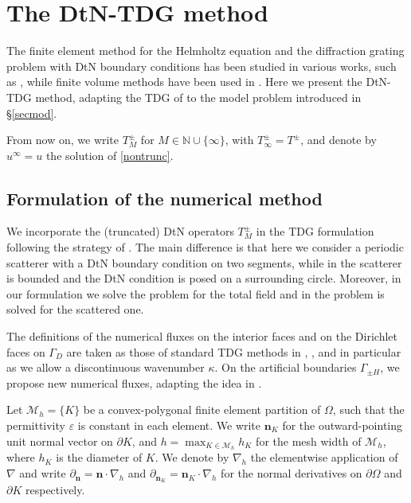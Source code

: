 \documentclass[a4paper,10pt]{article}
\newcommand{\IN}{{\mathbb N}}
\newcommand{\bn}{{\mathbf n}}
\newcommand{\Mh}{{\mathcal M_h}}
\newcommand{\dn}{{\partial_\bn}}
\newcommand{\dnK}{{\partial_{\bn_K}}}
\newcommand{\GD}{{\Gamma_D}}
\newcommand{\GpmH}{{\Gamma_{\pm H}}}
\begin{document}
\section{The DtN-TDG method}
\label{s:TDG}
The finite element method for the Helmholtz equation and the diffraction grating problem with DtN boundary conditions has been studied in various works, such as \cite{Bao2000,BaoLi2022,Bao1995}{, while finite volume methods have been used in} \cite{Wang2022}.
Here we present the DtN-TDG method, adapting the TDG of \cite{Hiptmair2011,Hiptmair2016,Kapita2018,Howarth2014} to the model problem introduced in \S\ref{secmod}.

From now on, we write $T_M^\pm$ for $M\in \IN\cup\{\infty\}$, with $T_\infty^\pm=T^\pm$, and denote by $u^\infty=u$ the solution of \eqref{nontrunc}.

\subsection{Formulation of the numerical method} \label{sec_tdg}

{We incorporate the (truncated) DtN operators $T^\pm_M$ in the TDG formulation following the strategy of }
\cite{Kapita2018}. 
The main difference is that here we consider a periodic scatterer with a DtN boundary condition on {two} segments, while in \cite{Kapita2018} the scatterer is bounded and the DtN {condition} is posed on a {surrounding} circle. 
Moreover, in our formulation we solve the problem for the total field and in \cite{Kapita2018} the problem is solved for the scattered one.

The definitions of the numerical fluxes on the interior faces and on the Dirichlet faces on $\GD$ are taken as those of standard TDG methods in \cite[\S2.2.1]{Hiptmair2016}, \cite{Hiptmair2011}, and in particular \cite[Ch.~3]{Howarth2014} as we allow a discontinuous wavenumber $\kappa$.
On the artificial boundaries $\GpmH$, we propose new numerical fluxes, adapting the idea in \cite{Kapita2018}.

Let $\Mh = \{ K \}$ be a convex-polygonal finite element partition of $\Omega$, 
such that the permittivity $\varepsilon$ is constant in each element.
We write $\bn_K$ for the outward-pointing unit normal vector on $\partial K$, and 
$h = \max_{K\in\Mh}h_K$ for the mesh width of $\Mh$,  
where $h_K$ is the diameter of $K$.
We denote by $\nabla_h$ the elementwise application of $\nabla$ and write $\dn = \bn \cdot \nabla_h$ and $\dnK = \bn_K \cdot \nabla_h$ for the normal derivatives on $\partial \Omega$ and $\partial K$ respectively.
\end{document}
